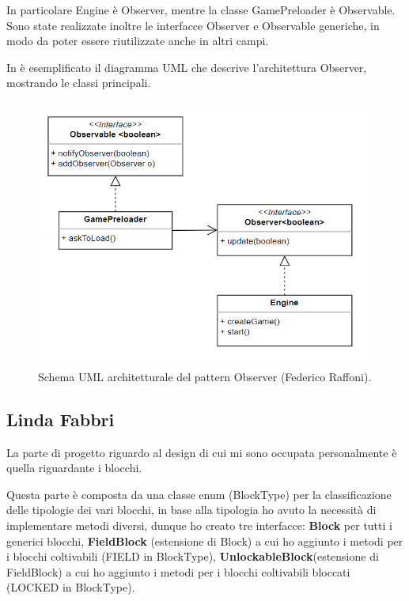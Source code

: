 \documentclass[a4paper,12pt]{report}
\begin{document}
In particolare Engine è Observer, mentre la classe GamePreloader è Observable.  Sono state realizzate inoltre le interfacce Observer e Observable generiche, in modo da poter essere riutilizzate anche in altri campi.

 In  è esemplificato il diagramma UML che descrive l'architettura Observer, mostrando le classi principali.

\hfill\break
\begin{figure}[!htb]
	\centering{}
	\includegraphics[width=\textwidth]{img/UML_ObserverRaffo.png}
	\caption{Schema UML architetturale del pattern Observer (Federico Raffoni).}
	\label{img:FedericoRaffoni_Observer}
\end{figure}

\subsection{Linda Fabbri}
La parte di progetto riguardo al design di cui mi sono occupata personalmente è quella riguardante i blocchi. 

Questa parte è composta da una classe enum (BlockType) per la classificazione delle tipologie dei vari blocchi, in base alla tipologia ho avuto la necessità di implementare metodi diversi, dunque ho creato tre interfacce: \textbf{Block} per tutti i generici blocchi, \textbf{FieldBlock} (estensione di Block) a cui ho aggiunto i metodi per i blocchi coltivabili (FIELD in BlockType), \textbf{UnlockableBlock}(estensione di FieldBlock) a cui ho aggiunto i metodi per i blocchi coltivabili bloccati (LOCKED in BlockType).
\end{document}

